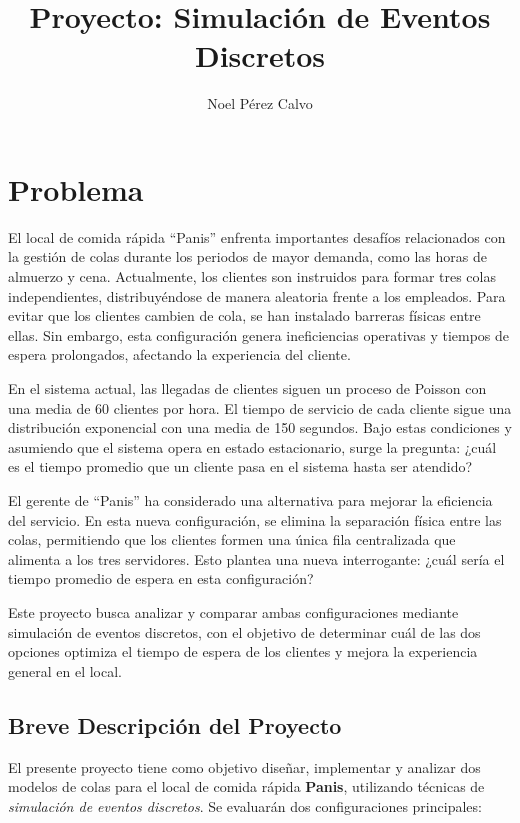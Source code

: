 \documentclass[a4paper,12pt]{article}
\title{Proyecto: Simulación de Eventos Discretos}
\author{Noel Pérez Calvo}
\begin{document}
\maketitle

\newpage

\tableofcontents
\newpage

\section{Problema}

El local de comida rápida “Panis” enfrenta importantes desafíos relacionados con la gestión de colas durante los periodos de mayor demanda, como las horas de almuerzo y cena. Actualmente, los clientes son instruidos para formar tres colas independientes, distribuyéndose de manera aleatoria frente a los empleados. Para evitar que los clientes cambien de cola, se han instalado barreras físicas entre ellas. Sin embargo, esta configuración genera ineficiencias operativas y tiempos de espera prolongados, afectando la experiencia del cliente.

En el sistema actual, las llegadas de clientes siguen un proceso de Poisson con una media de 60 clientes por hora. El tiempo de servicio de cada cliente sigue una distribución exponencial con una media de 150 segundos. Bajo estas condiciones y asumiendo que el sistema opera en estado estacionario, surge la pregunta: ¿cuál es el tiempo promedio que un cliente pasa en el sistema hasta ser atendido?

El gerente de “Panis” ha considerado una alternativa para mejorar la eficiencia del servicio. En esta nueva configuración, se elimina la separación física entre las colas, permitiendo que los clientes formen una única fila centralizada que alimenta a los tres servidores. Esto plantea una nueva interrogante: ¿cuál sería el tiempo promedio de espera en esta configuración?

Este proyecto busca analizar y comparar ambas configuraciones mediante simulación de eventos discretos, con el objetivo de determinar cuál de las dos opciones optimiza el tiempo de espera de los clientes y mejora la experiencia general en el local.

\subsection{Breve Descripción del Proyecto}

El presente proyecto tiene como objetivo diseñar, implementar y analizar dos modelos de colas para el local de comida rápida \textbf{Panis}, utilizando técnicas de \textit{simulación de eventos discretos}. Se evaluarán dos configuraciones principales:
\end{document}

